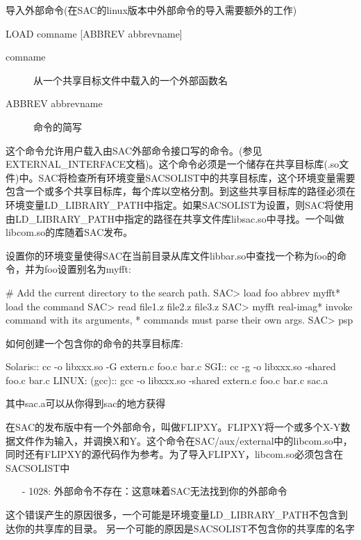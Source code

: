 \label{cmd:load}

导入外部命令(在SAC的linux版本中外部命令的导入需要额外的工作)

\begin{SACSTX}
LOAD comname [ABBREV abbrevname]
\end{SACSTX}

\begin{description}
\item [comname] 从一个共享目标文件中载入的一个外部函数名
\item [ABBREV abbrevname] 命令的简写
\end{description}

这个命令允许用户载入由SAC外部命令接口写的命令。(参见EXTERNAL\_INTERFACE文档)。这个命令必须是一个储存在共享目标库(.so文件)中。SAC将检查所有环境变量SACSOLIST中的共享目标库，这个环境变量需要包含一个或多个共享目标库，每个库以空格分割。到这些共享目标库的路径必须在环境变量LD\_LIBRARY\_PATH中指定。如果SACSOLIST为设置，则SAC将使用由LD\_LIBRARY\_PATH中指定的路径在共享文件库libsac.so中寻找。一个叫做libcom.so的库随着SAC发布。

设置你的环境变量使得SAC在当前目录从库文件libbar.so中查找一个称为foo的命令，并为foo设置别名为myfft:
\begin{SACCode}
#  Add the current directory to the search path.
SAC> load foo abbrev myfft* load the command
SAC> read file1.z file2.z file3.z
SAC> myfft real-imag* invoke command with its arguments,
* commands must parse their own args.
SAC> psp
\end{SACCode}

如何创建一个包含你的命令的共享目标库:
\begin{SACCode}
Solaris::
cc -o libxxx.so -G extern.c foo.c bar.c
SGI::
cc -g -o libxxx.so -shared foo.c bar.c
LINUX: (gcc)::
gcc -o libxxx.so -shared extern.c foo.c bar.c sac.a
\end{SACCode}
其中sac.a可以从你得到sac的地方获得

在SAC的发布版中有一个外部命令，叫做FLIPXY。FLIPXY将一个或多个X-Y数据文件作为输入，并调换X和Y。这个命令在SAC/aux/external中的libcom.so中，同时还有FLIPXY的源代码作为参考。为了导入FLIPXY，libcom.so必须包含在SACSOLIST中

\begin{itemize}
\item[-]1028: 外部命令不存在：这意味着SAC无法找到你的外部命令
\end{itemize}

这个错误产生的原因很多，一个可能是环境变量LD\_LIBRARY\_PATH不包含到达你的共享库的目录。
另一个可能的原因是SACSOLIST不包含你的共享库的名字
